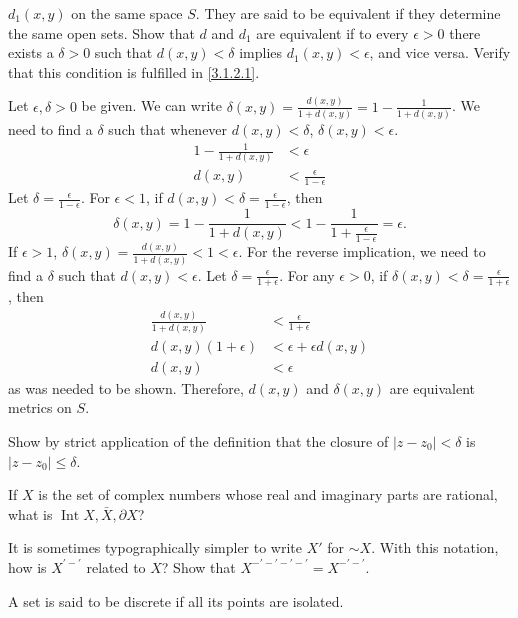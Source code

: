 \begin{exercise}[ref = \arabic{exercisei}]
  \(d_1(x,y)\) on the same space \(S\).
  They are said to be equivalent if they determine the same open sets.
  Show that \(d\) and \(d_1\) are equivalent if to every \(\epsilon > 0\) there
  exists a \(\delta > 0\) such that \(d(x,y) < \delta\) implies
  \(d_1(x,y) < \epsilon\), and vice versa.
  Verify that this condition is fulfilled in \cref{3.1.2.1}.
  \par\smallskip
  Let \(\epsilon,\delta > 0\) be given.
  We can write
  \(\delta(x,y) = \frac{d(x,y)}{1 + d(x,y)} = 1 - \frac{1}{1 + d(x,y)}\).
  We need to find a \(\delta\) such that whenever \(d(x,y) < \delta\),
  \(\delta(x,y) < \epsilon\).
  \begin{align*}
    1 - \frac{1}{1 + d(x, y)} & < \epsilon\\
    d(x, y) & < \frac{\epsilon}{1 - \epsilon}
  \end{align*}
  Let \(\delta = \frac{\epsilon}{1 - \epsilon}\).
  For \(\epsilon < 1\), if \(d(x,y) < \delta = \frac{\epsilon}{1 - \epsilon}\),
  then
  \[
    \delta(x,y) = 1 - \frac{1}{1 + d(x, y)} < 1 -
    \frac{1}{1 + \frac{\epsilon}{1 - \epsilon}} = \epsilon.
  \]
  If \(\epsilon > 1\),
  \(\delta(x,y) = \frac{d(x,y)}{1 + d(x,y)} < 1 < \epsilon\).
  For the reverse implication, we need to find a \(\delta\) such that
  \(d(x,y) < \epsilon\).
  Let \(\delta = \frac{\epsilon}{1 + \epsilon}\).
  For any \(\epsilon > 0\), if
  \(\delta(x,y) < \delta = \frac{\epsilon}{1 + \epsilon}\), then
  \begin{align*}
    \frac{d(x, y)}{1 + d(x, y)} & < \frac{\epsilon}{1 + \epsilon}\\
    d(x, y)(1 + \epsilon) & < \epsilon + \epsilon d(x, y)\\
    d(x, y) & < \epsilon
  \end{align*}
  as was needed to be shown.
  Therefore, \(d(x,y)\) and \(\delta(x,y)\) are equivalent metrics on \(S\).
\item
  Show by strict application of the definition that the closure of
  \(\lvert z - z_0\rvert < \delta\) is \(\lvert z - z_0\rvert\leq\delta\).
\item
  If \(X\) is the set of complex numbers whose real and imaginary parts are
  rational, what is \(\operatorname{Int} X, \bar{X}, \partial X\)?
\item
  It is sometimes typographically simpler to write \(X'\) for \(\sim X\).
  With this notation, how is \(X^{'-'}\) related to \(X\)?
  Show that \(X^{-'-'-'-'} = X^{-'-'}\).
\item
  A set is said to be discrete if all its points are isolated.

\end{exercise}
